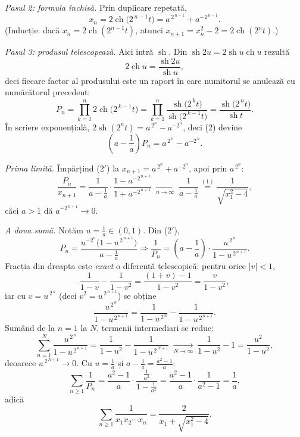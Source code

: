 \emph{Pasul 2: formula închisă.} Prin duplicare repetată,
\[ x_{n}=2\operatorname{ch}\bigl(2^{\,n-1}t\bigr)=a^{\,2^{\,n-1}}+a^{-2^{\,n-1}} . \]
(Inducție: dacă $x_{n}=2\operatorname{ch}(2^{n-1}t)$, atunci $x_{n+1}=x_{n}^{2}-2=2\operatorname{ch}(2^{n}t)$.)

\emph{Pasul 3: produsul telescopează.} Aici intră $\operatorname{sh}$. Din $\operatorname{sh}2u=2\operatorname{sh}u\operatorname{ch}u$ rezultă
\[ 2\operatorname{ch}u=\frac{\operatorname{sh}2u}{\operatorname{sh}u} , \]
deci fiecare factor al produsului este un raport în care numitorul se anulează cu numărătorul precedent:
\[ P_{n}=\prod_{k=1}^{n}2\operatorname{ch}\bigl(2^{\,k-1}t\bigr)=\prod_{k=1}^{n}\frac{\operatorname{sh}\bigl(2^{\,k}t\bigr)}{\operatorname{sh}\bigl(2^{\,k-1}t\bigr)}=\frac{\operatorname{sh}\bigl(2^{\,n}t\bigr)}{\operatorname{sh}t} . \tag{2} \]
În scriere exponențială, $2\operatorname{sh}(2^{n}t)=a^{\,2^{n}}-a^{-2^{n}}$, deci (2) devine
\[ \left(a-\frac1a\right)P_{n}=a^{\,2^{\,n}}-a^{-2^{\,n}} . \tag{2$'$} \]

\emph{Prima limită.} Împărțind (2$'$) la $x_{n+1}=a^{\,2^{n}}+a^{-2^{n}}$, apoi prin $a^{\,2^{n}}$:
\[ \frac{P_{n}}{x_{n+1}}=\frac{1}{a-\frac1a}\cdot\frac{1-a^{-2^{\,n+1}}}{1+a^{-2^{\,n+1}}}\ \xrightarrow[n\to\infty]{}\ \frac{1}{a-\frac1a}\overset{(1)}{=}\frac{1}{\sqrt{x_{1}^{2}-4}} , \]
căci $a>1$ dă $a^{-2^{\,n+1}}\to0$.

\emph{A doua sumă.} Notăm $u=\frac1a\in(0,1)$. Din (2$'$),
\[ P_{n}=\frac{u^{-2^{n}}\bigl(1-u^{\,2^{\,n+1}}\bigr)}{a-\frac1a} \Longrightarrow \frac{1}{P_{n}}=\left(a-\frac1a\right)\cdot\frac{u^{\,2^{\,n}}}{1-u^{\,2^{\,n+1}}} . \]
Fracția din dreapta este \emph{exact} o diferență telescopică: pentru orice $|v|<1$,
\[ \frac{1}{1-v}-\frac{1}{1-v^{2}}=\frac{(1+v)-1}{1-v^{2}}=\frac{v}{1-v^{2}} , \]
iar cu $v=u^{\,2^{\,n}}$ (deci $v^{2}=u^{\,2^{\,n+1}}$) se obține
\[ \frac{u^{\,2^{\,n}}}{1-u^{\,2^{\,n+1}}}=\frac{1}{1-u^{\,2^{\,n}}}-\frac{1}{1-u^{\,2^{\,n+1}}} . \]
Sumând de la $n=1$ la $N$, termenii intermediari se reduc:
\[ \sum_{n=1}^{N}\frac{u^{\,2^{\,n}}}{1-u^{\,2^{\,n+1}}}=\frac{1}{1-u^{2}}-\frac{1}{1-u^{\,2^{\,N+1}}}\ \xrightarrow[N\to\infty]{}\ \frac{1}{1-u^{2}}-1=\frac{u^{2}}{1-u^{2}} , \]
deoarece $u^{\,2^{\,N+1}}\to0$. Cu $u=\frac1a$ și $a-\frac1a=\frac{a^{2}-1}{a}$:
\[ \sum_{n\ge1}\frac{1}{P_{n}}=\frac{a^{2}-1}{a}\cdot\frac{\frac{1}{a^{2}}}{1-\frac{1}{a^{2}}}=\frac{a^{2}-1}{a}\cdot\frac{1}{a^{2}-1}=\frac{1}{a} , \]
adică
\[ \sum_{n\ge1}\frac{1}{x_{1}x_{2}\cdots x_{n}}=\frac{2}{x_{1}+\sqrt{x_{1}^{2}-4}} . \]

